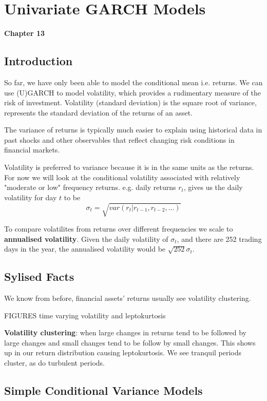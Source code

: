 \documentclass[11pt]{article}
\begin{document}
\newpage
\section{Univariate GARCH Models}
\textbf{Chapter 13}

\subsection{Introduction}

So far, we have only been able to model the conditional mean i.e. returns. We can use (U)GARCH to model volatility, which provides a rudimentary measure of the risk of investment. Volatility (standard deviation) is the square root of variance, represents the standard deviation of the returns of an asset.

The variance of returns is typically much easier to explain using historical data in past shocks and other observables that reflect changing risk conditions in financial markets.

Volatility is preferred to variance because it is in the same units as the returns. For now we will look at the conditional volatility associated with relatively "moderate or low" frequency returns. e.g. daily returns $r_t$, gives us the daily volatility for day $t$ to be
\[\sigma_t = \sqrt{var(r_t|r_{t-1}, r_{t-2}, \ldots)}\]

To compare volatilites from returns over different frequencies we scale to \textbf{annualised volatility}. Given the daily volatility of $\sigma_t$, and there are 252 trading days in the year, the annualised volatility would be $\sqrt{252} \sigma_t$.

\subsection{Sylised Facts}

We know from before, financial assets' returns usually see volatility clustering.

FIGURES time varying volatility and leptokurtosis

\begin{definition}
\textbf{Volatility clustering}: when large changes in returns tend to be followed by large changes and small changes tend to be follow by small changes. This shows up in our return distribution causing leptokurtosis. We see tranquil periods cluster, as do turbulent periods.
\end{definition}

\subsection{Simple Conditional Variance Models}
\end{document}

